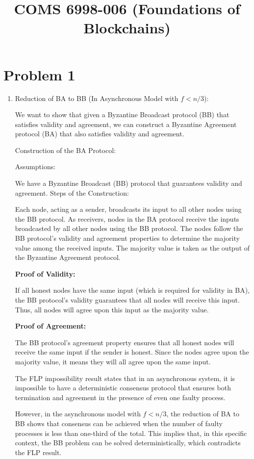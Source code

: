 \documentclass{article}
\title{COMS 6998-006 (Foundations of Blockchains) \par \exerciseset}
\author{\FirstAuther \qquad  \SecondAuther}
\begin{document}
\maketitle

\section*{Problem 1}


\begin{enumerate}
\item %
Reduction of BA to BB (In Asynchronous Model with $f < n/3$):

We want to show that given a Byzantine Broadcast protocol (BB) that satisfies validity and agreement, we can construct a Byzantine Agreement protocol (BA) that also satisfies validity and agreement.

Construction of the BA Protocol:

Assumptions:

We have a Byzantine Broadcast (BB) protocol that guarantees validity and agreement.
Steps of the Construction:

Each node, acting as a sender, broadcasts its input to all other nodes using the BB protocol.
As receivers, nodes in the BA protocol receive the inputs broadcasted by all other nodes using the BB protocol.
The nodes follow the BB protocol's validity and agreement properties to determine the majority value among the received inputs.
The majority value is taken as the output of the Byzantine Agreement protocol.

\textbf{Proof of Validity:}

If all honest nodes have the same input (which is required for validity in BA), the BB protocol's validity guarantees that all nodes will receive this input.
Thus, all nodes will agree upon this input as the majority value.

\textbf{Proof of Agreement:}

The BB protocol's agreement property ensures that all honest nodes will receive the same input if the sender is honest.
Since the nodes agree upon the majority value, it means they will all agree upon the same input.


The FLP impossibility result states that in an asynchronous system, it is impossible to have a deterministic consensus protocol that ensures both termination and agreement in the presence of even one faulty process.

However, in the asynchronous model with $f < n/3$, the reduction of BA to BB shows that consensus can be achieved when the number of faulty processes is less than one-third of the total. This implies that, in this specific context, the BB problem can be solved deterministically, which contradicts the FLP result.


\end{enumerate}
\end{document}
